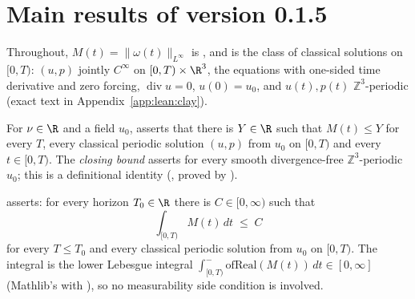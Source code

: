 \section{Main results of version 0.1.5}\label{sec:main}

Throughout, $M(t)=\|\omega(t)\|_{L^\infty}$ is , and
 is the class of classical solutions on $[0,T)$: $(u,p)$ jointly
$C^\infty$ on $[0,T)\times\R^3$, the equations with one-sided time derivative and zero forcing,
$\operatorname{div}u=0$, $u(0)=u_0$, and $u(t),p(t)$ $\mathbb{Z}^3$-periodic (exact text in
Appendix~\ref{app:lean:clay}).

\begin{definition}\label{def:ptb}
For $\nu\in\R$ and a field $u_0$,  asserts that there is $Y\in\R$ such that
$M(t)\le Y$ for every $T$, every classical periodic solution $(u,p)$ from $u_0$ on $[0,T)$ and every
$t\in[0,T)$. The \emph{closing bound}  asserts 
for every smooth divergence-free $\mathbb{Z}^3$-periodic $u_0$; this is a definitional identity
(, proved by ).
\end{definition}

\begin{definition}
 asserts: for every horizon $T_0\in\R$ there is $C\in[0,\infty)$ such
that
\[
\int_{[0,T)} M(t)\,dt\;\le\;C
\]
for every $T\le T_0$ and every classical periodic solution from $u_0$ on $[0,T)$. The integral is the lower
Lebesgue integral $\int^{-}_{[0,T)}\mathrm{ofReal}(M(t))\,dt\in[0,\infty]$ (Mathlib's  with
), so no measurability side condition is involved.
\end{definition}


